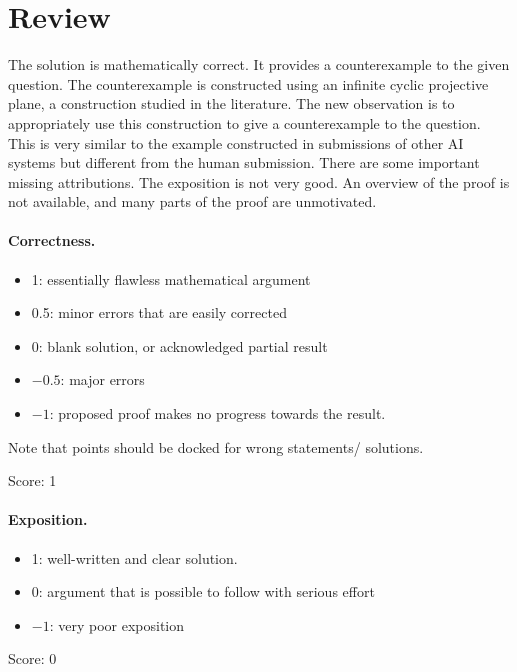 \documentclass[11pt]{article}
\begin{document}
\maketitle

\section{Review}
{The solution is mathematically correct. It provides a counterexample to the given question. The counterexample is constructed using an infinite cyclic projective plane, a construction studied in the literature. The new observation is to appropriately use this construction to give a counterexample to the question. This is very similar to the example constructed in submissions of other AI systems but different from the human submission. There are some important missing attributions. The exposition is not very good. An overview of the proof is not available, and many parts of the proof are unmotivated.
}

\paragraph{Correctness.}
\begin{itemize}
	\item  1: essentially flawless mathematical argument
	\item  0.5: minor errors that are easily corrected
	\item  0: blank solution, or acknowledged partial result
	\item  $-0.5$: major errors
	\item  $-1$: proposed proof makes no progress towards the result.
\end{itemize}
Note that points should be docked for wrong statements/ solutions.

\noindent Score: 1

\paragraph{Exposition.}
\begin{itemize}
	\item  1: well-written and clear solution.
	\item  0: argument that is possible to follow with serious effort
	\item  $-1$: very poor exposition
\end{itemize}

\noindent Score: 0
\end{document}
